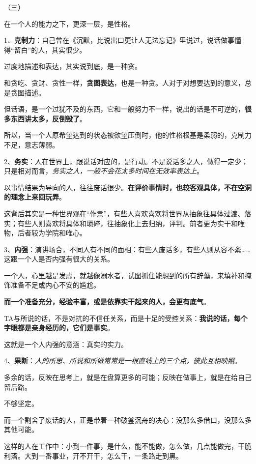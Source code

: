 \documentclass[UTF8,a4paper,8pt]{ctexbook}
\begin{document}
		
		
		（三）
		
		在一个人的能力之下，更深一层，是性格。
		
		1、\textbf{克制力}：自己曾在《沉默，比说出口更让人无法忘记》里说过，说话做事懂得“留白”的人，其实很少。
		
		过度地描述和表达，其实说到底，是一种贪。
		
		和贪吃、贪财、贪性一样，\textbf{贪图表达}，也是一种贪。人对于对想要达到的意义，总是贪图描述。
		
		但话语，是一个过犹不及的东西，它和一般努力不一样，说出的话是不可逆的，\textbf{很多东西讲太多，反倒毁了}。
		
		所以，当一个人原希望达到的状态被欲望压倒时，他的性格根基是柔弱的，克制力不足，意志薄弱。
		
		2、\textbf{务实}：人在世界上，跟说话对应的，是行动。不是说话多之人，做得一定少；只是相对而言，\textit{务实之人，一般不会花太多时间在无效率表达上}。
		
		以事情结果为导向的人，往往废话很少。\textbf{在评价事情时，也较客观具体，不在空洞的理念上来回玩弄}。
		
		这背后其实是一种世界观在“作祟”，有些人喜欢喜欢将世界从抽象往具体过渡、落实；有些人则喜欢将具体和琐碎，往抽象化上去归纳，评判。前者更为实干和唯物，后者较为学院和唯心。
		
		3、\textbf{内强}：演讲场合，不同人有不同的面相：有些人废话多，有些人则从容不紊……这跟一个人是否内强有很大的关系。
		
		一个人，心里越是发虚，就越像溺水者，试图抓住能想到的所有辞藻，来填补和掩饰准备不足或内心不安的尴尬。
		
		\textbf{而一个准备充分，经验丰富，或是依靠实干起来的人，会更有底气}。
		
		TA与所说的话，不是对抗的不信任关系，而是十足的受控关系：\textbf{我说的话，每个字眼都是亲身经历的，它们是事实}。
		
		这就是一个人内强的意涵：真实的实力。
		
		4、\textbf{果断}：\textit{人的所思、所说和所做常常是一根直线上的三个点，彼此互相映照}。
		
		多余的话，反映在思考上，就是在盘算更多的可能；反映在做事上，就是在给自己留后路。
		
		不够坚定。
		
		而一个割舍了废话的人，正是带着一种破釜沉舟的决心：没那么多借口，没那么多其他可能。
		
		这样的人在工作中：小到一件事，是什么，能不能做，怎么做，几点能做完，干脆利落。大到一番事业，开不开干，怎么干，一条路走到黑。
		
\end{document}
